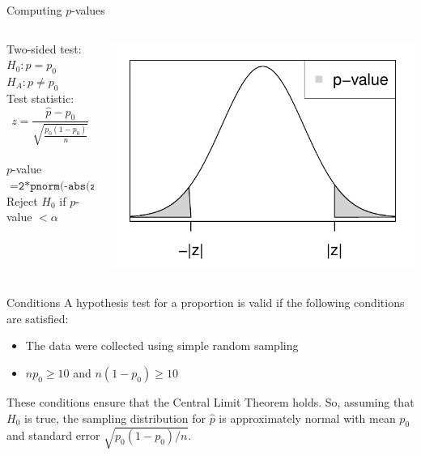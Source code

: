 \documentclass[fleqn, 11pt]{beamer}
\begin{document}
\begin{frame}{Computing $p$-values}
\begin{columns}
\begin{column}{0.55\textwidth}
Two-sided test:\\
$H_0: p = p_0$\\
$H_A: p \neq p_0$\\
\vspace{10pt}
Test statistic:\\
\[ z = \frac{\hat{p} - p_0}{\sqrt{\frac{p_0(1-p_0)}{n}}} \]\\
\vspace{10pt}
$p$-value $= \texttt{2*pnorm(-abs(z))}$\\ 
\vspace{10pt}
Reject $H_0$ if $p$-value $< \alpha$\\
\end{column}
\begin{column}{0.45\textwidth}
\includegraphics[scale=0.5]{figure/pvalue_both.pdf}
\end{column}
\end{columns}
\end{frame}

\begin{frame}{Conditions}
A hypothesis test for a proportion is valid if the following conditions are satisfied:\\
\begin{itemize}
\item The data were collected using simple random sampling
\item $n p_0 \geq 10$ and $n(1-p_0) \geq 10$
\end{itemize}

\vspace{10pt}
These conditions ensure that the Central Limit Theorem holds.  So, assuming that $H_0$ is true, the sampling distribution for $\hat{p}$ is approximately normal with mean $p_0$ and standard error $\sqrt{p_0 (1-p_0) / n}$.
\end{frame}
\end{document}
